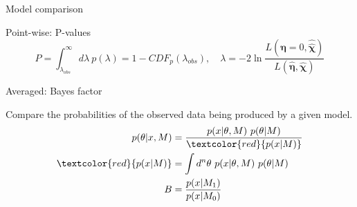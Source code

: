 \documentclass[
aspectratio=169,
14pt,
professionalfonts
]{beamer}
\begin{document}
\begin{frame}
    \center
    \Large
    Model comparison
\end{frame}

\begin{frame}{Point-wise: P-values}
    $$
    P = \int_{\lambda_{obs}}^\infty d\lambda ~ p(\lambda) = 1 - CDF_{p}(\lambda_{obs}), \quad  \lambda = -2 \ln \frac{L(\boldsymbol{\eta} = 0, \hat{\hat{\boldsymbol{\chi}}})}{L(\hat{\boldsymbol{\eta}}, \hat{ \boldsymbol{\chi}})}
    $$
\end{frame}

\begin{frame}{Averaged: Bayes factor}
    \vspace{-0.5cm}
        \begin{minipage}{0.74\textwidth}
            Compare the probabilities of the observed data being produced by a given model.
            \begin{align*}
                p(\theta | x, M) &= \frac{p(x | \theta, M) ~ p(\theta | M)}{\textcolor{red}{p(x | M)}}\\
                \textcolor{red}{p(x | M)} &= \int d^n \theta ~ p(x | \theta, M) ~ p(\theta | M)\\
                B &= \frac{p(x | M_1)}{p(x| M_0)}
            \end{align*}
        \end{minipage}
        \begin{minipage}{0.25\textwidth}
            \begin{figure}
                \centering

\end{figure}
\end{minipage}
\end{frame}
\end{document}
